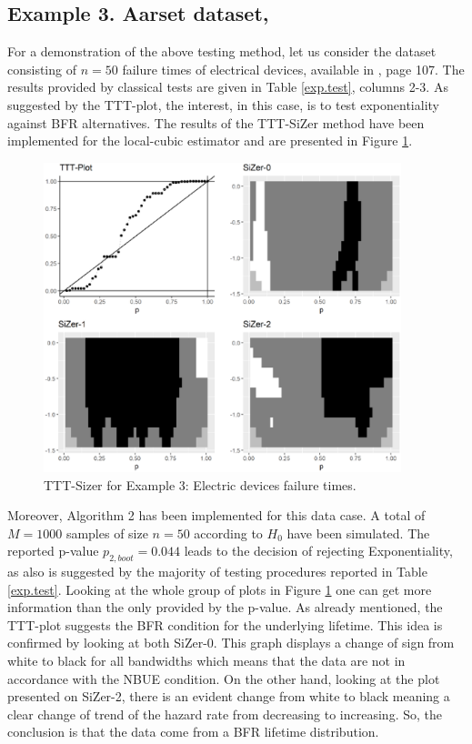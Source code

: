 \documentclass[preprint,12pt]{elsarticle}
\begin{document}
\subsection*{Example 3. Aarset dataset, \cite{A1987}}
For a demonstration of the above  testing method, let us consider the dataset consisting of $n=50$ failure times of electrical devices, available in \cite{A1987}, page 107. The results provided by classical tests are given in Table \ref{exp.test}, columns 2-3.
As suggested by the TTT-plot, the interest, in this case, is to test exponentiality against BFR alternatives. The results of the TTT-SiZer method have been implemented for the local-cubic estimator and are presented in Figure \ref{Fig:aarset}. 
\begin{figure}[htb]
\begin{center}
\includegraphics[height= 9cm]{Fig4_aarsetCubicPuntual_log10}%
\caption{TTT-Sizer for Example 3: Electric devices failure times.}\label{Fig:aarset}
\end{center}
\end{figure}

Moreover, Algorithm 2 has been implemented for this data case. A total of $M=1000$ samples of size $n=50$ according to $H_0$ have been simulated. The reported p-value $p_{2,boot}=0.044$ leads to the decision of rejecting Exponentiality, as also is suggested by the majority of testing procedures reported in Table \ref{exp.test}. Looking at the whole group of plots in Figure \ref{Fig:aarset} one can get more information than the only provided by the p-value. As already mentioned, the TTT-plot suggests the BFR condition for the underlying lifetime. This idea is confirmed by looking at both SiZer-0. This graph displays a change of sign from white to black for all bandwidths which means that the data are not in accordance with the NBUE condition. On the other hand, looking at the plot presented on SiZer-2, there is an evident change from white to black meaning a clear change of trend of the hazard rate from decreasing to increasing. So, the conclusion is that the data come from a BFR lifetime distribution. 
\end{document}
